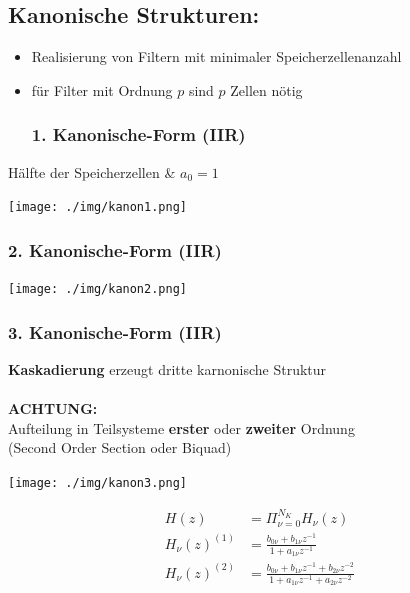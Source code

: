 \documentclass[10pt,a4paper]{article}
\begin{document}
\subsection{Kanonische Strukturen: }
\begin{itemize}
  \item Realisierung von Filtern mit minimaler Speicherzellenanzahl
  \item für Filter mit Ordnung $p$ sind $p$ Zellen nötig
\subsubsection{1. Kanonische-Form (IIR)}
\end{itemize}
Hälfte der Speicherzellen \& $a_0=1$
  \begin{center}
      \texttt{[image: ./img/kanon1.png]}
  \end{center}
\subsubsection{2. Kanonische-Form (IIR)}
  \begin{center}
      \texttt{[image: ./img/kanon2.png]}
  \end{center}
\subsubsection{3. Kanonische-Form (IIR)}
\textbf{Kaskadierung} erzeugt dritte karnonische Struktur\\\\
\textbf{ACHTUNG: } \\
Aufteilung in Teilsysteme \textbf{erster} oder \textbf{zweiter} Ordnung\\
 (\grqq{}Second Order Section\grqq{} oder \grqq{}Biquad\grqq{})
  \begin{center}
      \texttt{[image: ./img/kanon3.png]}
  \end{center}
  \begin{mdframed}[style=exercise]
    \begin{align}
        H(z)&=\Pi_{\nu=0}^{N_K} H_\nu(z)\\
        H_\nu(z)^{(1)}&=\frac{b_{0\nu}+b_{1\nu}z^{-1}}{1+a_{1\nu}z^{-1}}\\
        H_\nu(z)^{(2)}&=\frac{b_{0\nu}+b_{1\nu}z^{-1}+b_{2\nu}z^{-2}}{1+a_{1\nu}z^{-1}+a_{2\nu}z^{-2}}
    \end{align}
  \end{mdframed}
\end{document}
